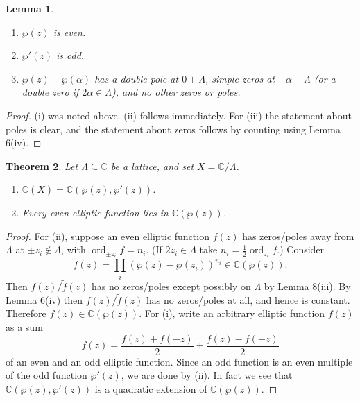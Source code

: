 \documentclass[a4paper]{article}
\newtheorem{theorem}{Theorem}
\newtheorem{lemma}[theorem]{Lemma}
\theoremstyle{definition}
\DeclareMathOperator{\ord}{ord}
\newcommand{\C}{\mathbb{C}}
\begin{document}
\begin{lemma}
    ~
    \begin{enumerate}[label=(\roman*)]
        \item $\wp(z)$ is even.
        \item $\wp'(z)$ is odd.
        \item $\wp(z)-\wp(\alpha)$ has a double pole at $0+\Lambda$, simple
            zeros at $\pm\alpha+\Lambda$ (or a double zero if
            $2\alpha\in\Lambda$), and no other zeros or poles.
    \end{enumerate}
\end{lemma}

\begin{proof}
    (i) was noted above. (ii) follows immediately. For (iii) the statement about
    poles is clear, and the statement about zeros follows by counting using
    Lemma 6(iv).
\end{proof}

\begin{theorem}
    Let $\Lambda\subseteq\C$ be a lattice, and set $X=\C/\Lambda$.
    \begin{enumerate}[label=(\roman*)]
        \item $\C(X)=\C(\wp(z),\wp'(z))$.
        \item Every even elliptic function lies in $\C(\wp(z))$.
    \end{enumerate}
\end{theorem}

\begin{proof}
    For (ii), suppose an even elliptic function $f(z)$ has zeros/poles away from
    $\Lambda$ at $\pm z_i\notin\Lambda$, with $\ord_{\pm z_i}f=n_i$. (If
    $2z_i\in\Lambda$ take $n_i=\frac{1}{2}\ord_{z_i}f$.) Consider
    \begin{equation*}
        \tilde f(z)=\prod_i(\wp(z)-\wp(z_i))^{n_i} \in \C(\wp(z)).
    \end{equation*}
    Then $f(z)/\tilde f(z)$ has no zeros/poles except possibly on $\Lambda$ by
    Lemma 8(iii). By Lemma 6(iv) then $f(z)/\tilde f(z)$ has no zeros/poles at
    all, and hence is constant. Therefore $f(z)\in\C(\wp(z))$. For (i), write an
    arbitrary elliptic function $f(z)$ as a sum
    \begin{equation*}
        f(z) = \frac{f(z)+f(-z)}{2} + \frac{f(z)-f(-z)}{2}
    \end{equation*}
    of an even and an odd elliptic function. Since an odd function is an even
    multiple of the odd function $\wp'(z)$, we are done by (ii). In fact we see
    that $\C(\wp(z),\wp'(z))$ is a quadratic extension of $\C(\wp(z))$.
\end{proof}
\end{document}
